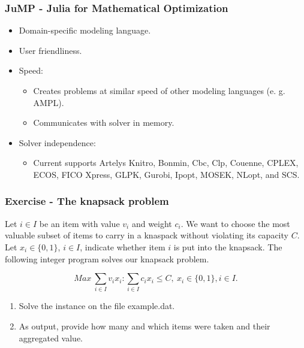 \documentclass{beamer}
\begin{document}
\begin{frame}
  \frametitle{JuMP - Julia for Mathematical Optimization}

  \footnotesize
  \begin{itemize}
    \item <2-> [] Domain-specific modeling language.
    \item <3-> [] User friendliness.
    \item <4-> [] Speed:
      \begin{itemize}
        \item [] Creates problems at similar speed of other modeling languages (e. g. AMPL).
        \item [] Communicates with solver in memory.
      \end{itemize}
    \item <5-> [] Solver independence:
      \begin{itemize}
      \item [] Current supports Artelys Knitro, Bonmin, Cbc, Clp, Couenne, CPLEX, ECOS, FICO Xpress, GLPK, Gurobi, Ipopt, MOSEK, NLopt, and SCS.
      \end{itemize}
  \end{itemize}
  
\end{frame}


\begin{frame}
  \centering
  \vfill
  \vfill
\end{frame}


\begin{frame}
  \frametitle{Exercise - The knapsack problem}
  {\footnotesize Let $i \in I$ be an item with value $v_i$ and weight $c_i$. We want to choose the most valuable subset of items to carry in a knaspack without violating its capacity $C$. Let $x_i \in \{0, 1\}$, $i \in I$, indicate whether item $i$ is put into the knapsack. The following integer program solves our knapsack problem.}

  \vspace{-1cm}
  \begin{center}
  \begin{equation*}
  Max\ \sum_{i \in I} v_i x_i: \sum_{i \in I} c_i x_i \leq C, \ x_i \in \{0, 1\}, i \in I.
  \end{equation*}
  \end{center}

  \footnotesize
  \begin{enumerate}
  \item Solve the instance on the file example.dat.
  \item As output, provide how many and which items were taken and their aggregated value.
  \end{enumerate}
  
\end{frame}
\end{document}
